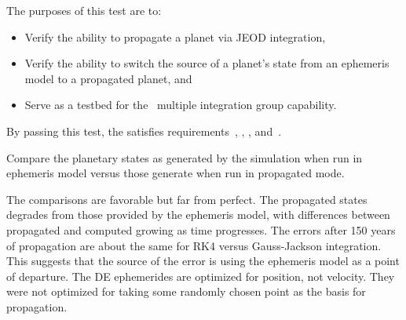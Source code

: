\label{test:sim_prop_planet}
\begin{description:}
\item[Purpose]
The purposes of this test are to:
\begin{itemize}
\item Verify the ability to propagate a planet via JEOD integration,
\item Verify the ability to switch the source of a planet's state 
from an ephemeris model to a propagated planet, and
\item Serve as a testbed for the
\SIMINTERFACE\ multiple integration group capability.
\end{itemize}
\item[Requirements]
By passing this test, the \ModelDesc satisfies
requirements~,
,
,
and~.
\item[Procedure]
Compare the planetary states as generated by the simulation
when run in ephemeris model versus those generate when run in propagated mode.
\item[Results]
The comparisons are favorable but far from perfect.
The propagated states degrades from those provided by the
ephemeris model, with differences between propagated and computed
growing as time progresses.
The errors after 150 years of propagation are about the same for RK4 versus
Gauss-Jackson integration.
This suggests that the source of the error is using the
ephemeris model as a point of departure.
The DE ephemerides are optimized for position, not velocity.
They were not optimized for taking some randomly chosen point
as the basis for propagation.
\end{description:}